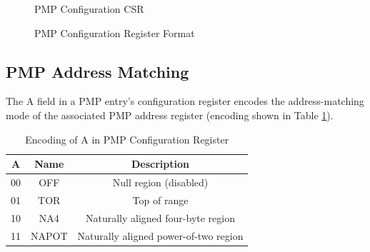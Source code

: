 \begin{figure}[htbp]
  \centering
  \def\stackalignment{r} %
  {\scriptsize }
  \caption{PMP Configuration CSR}
  \label{fig:pmpaddr}
\end{figure}

\begin{figure}[htbp]
  \centering
  \def\stackalignment{r} %
  {\scriptsize }
  \caption{PMP Configuration Register Format}
  \label{fig:pmpconf}
\end{figure}

\subsection{PMP Address Matching}
\label{subsec:pmpaddressmatching}

The A field in a PMP entry’s configuration register encodes the address-matching
mode of the associated PMP address register (encoding shown in Table
\ref{tab:addressmatching}).

\begin{table}
  \centering
  \begin{tabular}{|c|c|c|}
    \hline
    \textbf{A} & \textbf{Name} & \textbf{Description}                  \\
    \hline
    00         & OFF           & Null region (disabled)                \\
    \hline
    01         & TOR           & Top of range                          \\
    \hline
    10         & NA4           & Naturally aligned four-byte region    \\
    \hline
    11         & NAPOT         & Naturally aligned power-of-two region \\
    \hline
  \end{tabular}
  \caption{Encoding of A in PMP Configuration Register}
  \label{tab:addressmatching}
\end{table}

